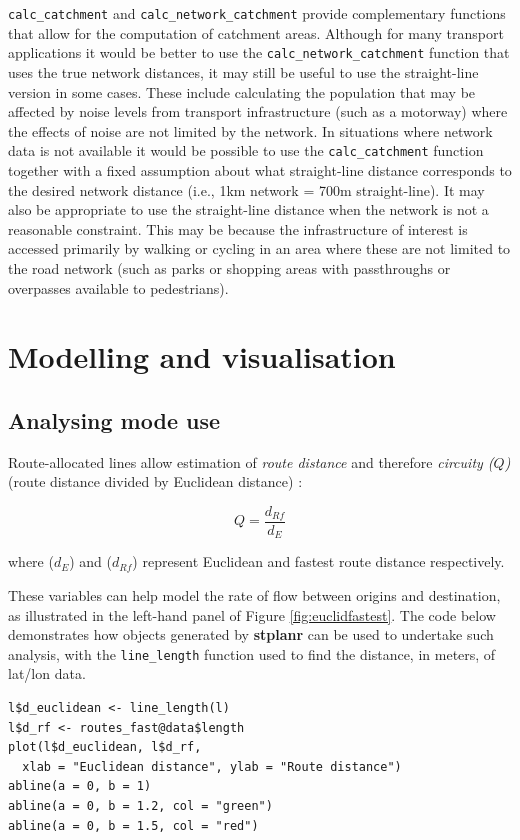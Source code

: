 \texttt{calc\_catchment} and \texttt{calc\_network\_catchment} provide complementary functions that allow for the computation of catchment areas.
Although for many transport applications it would be better to use the \texttt{calc\_network\_catchment} function that uses the true network distances, it may still be useful to use the straight-line version in some cases.
These include calculating the population that may be affected by noise levels from transport infrastructure (such as a motorway) where the effects of noise are not limited by the network.
In situations where network data is not available it would be possible to use the \texttt{calc\_catchment} function together with a fixed assumption about what straight-line distance corresponds to the desired network distance (i.e., 1km network = 700m straight-line).
It may also be appropriate to use the straight-line distance when the network is not a reasonable constraint.
This may be because the infrastructure of interest is accessed primarily by walking or cycling in an area where these are not limited to the road network (such as parks or shopping areas with passthroughs or overpasses available to pedestrians).

\section{Modelling and visualisation}\label{modelling-and-visualisation}

\subsection{Analysing mode use}\label{modelling-mode-choice}

Route-allocated lines allow estimation of \emph{route distance} and therefore
\emph{circuity ($Q$)} (route distance divided by Euclidean distance)
\citep{levinson_minimum_2009}:

\[
 Q = \frac{d_{Rf}}{d_E}
\]

where (\(d_E\)) and (\(d_{Rf}\)) represent
Euclidean and fastest route distance respectively.

These
variables can help model the rate of flow between origins and
destination, as illustrated in the left-hand panel of Figure
\ref{fig:euclidfastest}. The code below demonstrates how objects
generated by \textbf{stplanr} can be used to undertake such analysis,
with the \texttt{line\_length} function used to find the distance, in
meters, of lat/lon data.

\begin{verbatim}
l$d_euclidean <- line_length(l)
l$d_rf <- routes_fast@data$length
plot(l$d_euclidean, l$d_rf,
  xlab = "Euclidean distance", ylab = "Route distance")
abline(a = 0, b = 1)
abline(a = 0, b = 1.2, col = "green")
abline(a = 0, b = 1.5, col = "red")
\end{verbatim}

